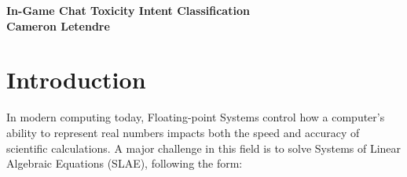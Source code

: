 \documentclass[a4paper,10.5pt,twoside]{article}
\begin{document}
\fancyhead[LE]{\thepage\ \ \ \   }
\begin{center}
\LARGE
\textbf{ In-Game Chat Toxicity Intent Classification} \\[12pt]
\normalsize
\textbf {Cameron Letendre}\\[4pt]
\end{center}

\begin{abstract}
\normalsize
Inside this paper we explore the possibility of creating a more accuracte prediction of toxicity in gaming messages, while trying to preserve speed for a real-time overlay. Modern gaming is known to be very structurally different from common langauge, but more than that because of the heavy involvement of slang, acronyms, and in-game vocabulary along with an average of 4 characters per message this creates a challenge for machine learning models. In this paper we attempt to do intent classification on these messages predicting them into one of four groups. (E) Explicit Toxicity, (I) Implicit Toxicity, (A) Action, and (O) Other. This classification task for this assigment is done by a distilbert model that is fine tuned on a labeled dataset known as CONDA. 

\vspace{1em}

\textbf{Keywords:} .
\end{abstract}

\section*{Introduction}

    In modern computing today, Floating-point Systems control how a computer's ability to represent real numbers impacts both the speed and accuracy of scientific calculations. A major challenge in this field is to solve Systems of Linear Algebraic Equations (SLAE), following the form:
\end{document}
